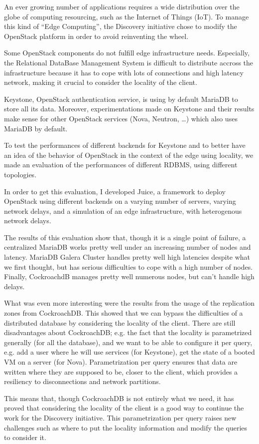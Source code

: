An ever growing number of applications requires a wide distribution over the globe of computing resourcing, such as the Internet of Things (IoT). To manage this kind of ``Edge Computing'', the Discovery initiative chose to modify the OpenStack platform in order to avoid reinventing the wheel.

Some OpenStack components do not fulfill edge infrastructure needs. Especially, the Relational DataBase Management System is difficult to distribute accross the infrastructure because it has to cope with lots of connections and high latency network, making it crucial to consider the locality of the client.

Keystone, OpenStack authentication service, is using by default MariaDB to store all its data. Moreover, experimentations made on Keystone and their results make sense for other OpenStack services (Nova, Neutron, \dots) which also uses MariaDB by default.

To test the performances of different backends for Keystone and to better have an idea of the behavior of OpenStack in the context of the edge using locality, we made an evaluation of the performances of different RDBMS, using different topologies.

In order to get this evaluation, I developed Juice, a framework to deploy OpenStack using different backends on a varying number of servers, varying network delays, and a simulation of an edge infrastructure, with heterogenous network delays.

The results of this evaluation show that, though it is a single point of failure, a centralized MariaDB works pretty well under an increasing number of nodes and latency. MariaDB Galera Cluster handles pretty well high latencies despite what we first thought, but has serious difficulties to cope with a high number of nodes. Finally, CockroachdB manages pretty well numerous nodes, but can't handle high delays.

What was even more interesting were the results from the usage of the replication zones from CockroachDB. This showed that we can bypass the difficulties of a distributed database by considering the locality of the client. There are still disadvantages about CockroachDB; e.g. the fact that the locality is parametrized generally (for all the database), and we want to be able to configure it per query, e.g. add a user where he will use services (for Keystone), get the state of a booted VM on a server (for Nova). Parametrization per query ensures that data are written where they are supposed to be, closer to the client, which provides a resiliency to disconnections and network partitions.

This means that, though CockroachDB is not entirely what we need, it has proved that considering the locality of the client is a good way to continue the work for the Discovery initiative. This parametrization per query raises new challenges such as where to put the locality information and modify the queries to consider it.
